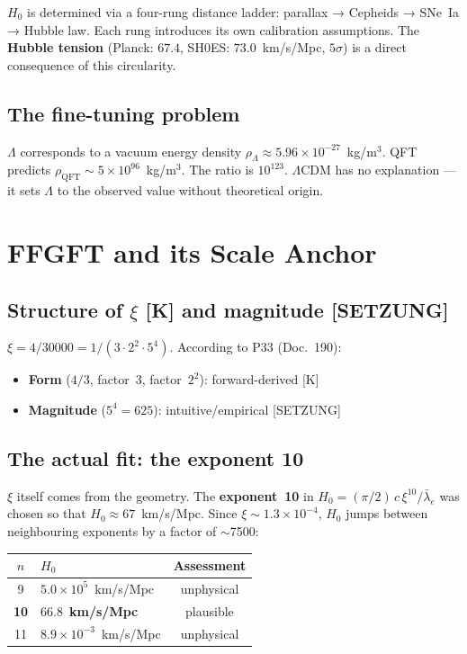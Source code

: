 $H_0$ is determined via a four-rung distance ladder:
parallax → Cepheids → SNe~Ia → Hubble law. Each rung introduces its
own calibration assumptions. The \textbf{Hubble tension} (Planck:
$67.4$, SH0ES: $73.0$~km/s/Mpc, $5\sigma$) is a direct consequence
of this circularity.

\section{The fine-tuning problem}

$\Lambda$ corresponds to a vacuum energy density
$\rho_\Lambda \approx 5.96\times10^{-27}$~kg/m$^3$.
QFT predicts $\rho_\text{QFT} \sim 5\times10^{96}$~kg/m$^3$.
The ratio is $10^{123}$. $\Lambda$CDM has no explanation —
it sets $\Lambda$ to the observed value without theoretical origin.

\chapter{FFGFT and its Scale Anchor}

\section{Structure of $\xi$ [K] and magnitude [SETZUNG]}

$\xi = 4/30000 = 1/(3\cdot2^2\cdot5^4)$.
According to P33 (Doc.~190):

\begin{itemize}
  \item \textbf{Form} ($4/3$, factor~3, factor~$2^2$):
        forward-derived [K]
  \item \textbf{Magnitude} ($5^4 = 625$): intuitive/empirical [SETZUNG]
\end{itemize}

\section{The actual fit: the exponent 10}

$\xi$ itself comes from the geometry. The \textbf{exponent~10} in
$H_0 = (\pi/2)\,c\,\xi^{10}/\bar\lambda_e$ was chosen so that
$H_0 \approx 67$~km/s/Mpc. Since $\xi \sim 1.3\times10^{-4}$,
$H_0$ jumps between neighbouring exponents by a factor of $\sim$7500:

\begin{center}
\begin{tabular}{clc}
\toprule
$n$ & $H_0$ & Assessment \\
\midrule
9  & $5.0\times10^5$~km/s/Mpc & unphysical \\
\textbf{10} & $\mathbf{66.8}$~\textbf{km/s/Mpc} & plausible \\
11 & $8.9\times10^{-3}$~km/s/Mpc & unphysical \\
\bottomrule
\end{tabular}
\end{center}

